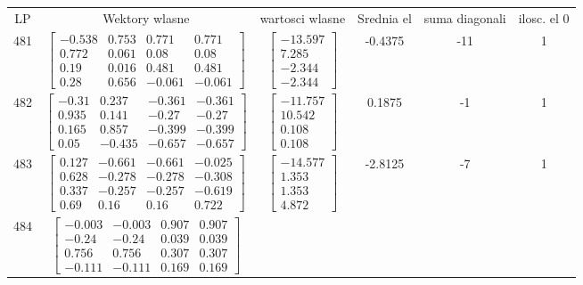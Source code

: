 \documentclass[a4paper,12pt]{article}
\begin{document}
\bgroup {} \vspace{0.2in} \begin{tabular}{c c c c c c}
LP &Wektory wlasne & wartosci wlasne & Srednia el & suma diagonali & ilosc. el 0\\
481
&
$\begin{bmatrix} -0.538 & 0.753 & 0.771 & 0.771 \\ 0.772 & 0.061 & 0.08 & 0.08 \\ 0.19 & 0.016 & 0.481 & 0.481 \\ 0.28 & 0.656 & -0.061 & -0.061 \end{bmatrix}$
&
$\begin{bmatrix} -13.597 \\ 7.285 \\ -2.344 \\ -2.344 \end{bmatrix}$
&
-0.4375
&
-11
&
1
\\
482
&
$\begin{bmatrix} -0.31 & 0.237 & -0.361 & -0.361 \\ 0.935 & 0.141 & -0.27 & -0.27 \\ 0.165 & 0.857 & -0.399 & -0.399 \\ 0.05 & -0.435 & -0.657 & -0.657 \end{bmatrix}$
&
$\begin{bmatrix} -11.757 \\ 10.542 \\ 0.108 \\ 0.108 \end{bmatrix}$
&
0.1875
&
-1
&
1
\\
483
&
$\begin{bmatrix} 0.127 & -0.661 & -0.661 & -0.025 \\ 0.628 & -0.278 & -0.278 & -0.308 \\ 0.337 & -0.257 & -0.257 & -0.619 \\ 0.69 & 0.16 & 0.16 & 0.722 \end{bmatrix}$
&
$\begin{bmatrix} -14.577 \\ 1.353 \\ 1.353 \\ 4.872 \end{bmatrix}$
&
-2.8125
&
-7
&
1
\\
484
&
$\begin{bmatrix} -0.003 & -0.003 & 0.907 & 0.907 \\ -0.24 & -0.24 & 0.039 & 0.039 \\ 0.756 & 0.756 & 0.307 & 0.307 \\ -0.111 & -0.111 & 0.169 & 0.169 \end{bmatrix}$

\end{tabular}
\end{document}
